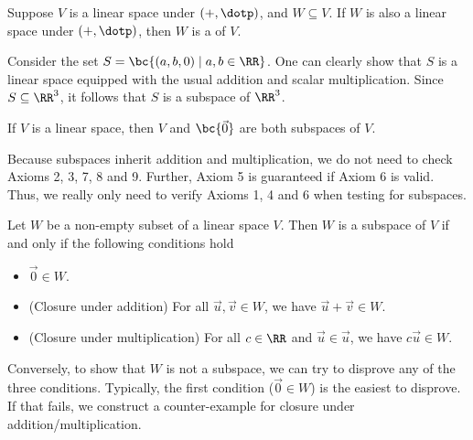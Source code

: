 \begin{definition}
    Suppose $V$ is a linear space under $(+, \dotp)$, and $W \subseteq V$. If $W$ is also a linear space under $(+, \dotp)$, then $W$ is a  of $V$.
\end{definition}

\begin{example}
    Consider the set $S = \bc{(a, b, 0) \mid a, b \in \RR}$. One can clearly show that $S$ is a linear space equipped with the usual addition and scalar multiplication. Since $S \subseteq \RR^3$, it follows that $S$ is a subspace of $\RR^3$.
\end{example}

\begin{example}
    If $V$ is a linear space, then $V$ and $\bc{\vec 0}$ are both subspaces of $V$.
\end{example}

Because subspaces inherit addition and multiplication, we do not need to check Axioms 2, 3, 7, 8 and 9. Further, Axiom 5 is guaranteed if Axiom 6 is valid. Thus, we really only need to verify Axioms 1, 4 and 6 when testing for subspaces.

\begin{recipe}
    Let $W$ be a non-empty subset of a linear space $V$. Then $W$ is a subspace of $V$ if and only if the following conditions hold
    \begin{itemize}
        \item $\vec 0 \in W$.
        \item (Closure under addition) For all $\vec u, \vec v \in W$, we have $\vec u + \vec v \in W$.
        \item (Closure under multiplication) For all $c \in \RR$ and $\vec u \in \vec u$, we have $c \vec u \in W$.
    \end{itemize}
\end{recipe}

Conversely, to show that $W$ is not a subspace, we can try to disprove any of the three conditions. Typically, the first condition ($\vec 0 \in W$) is the easiest to disprove. If that fails, we construct a counter-example for closure under addition/multiplication.

